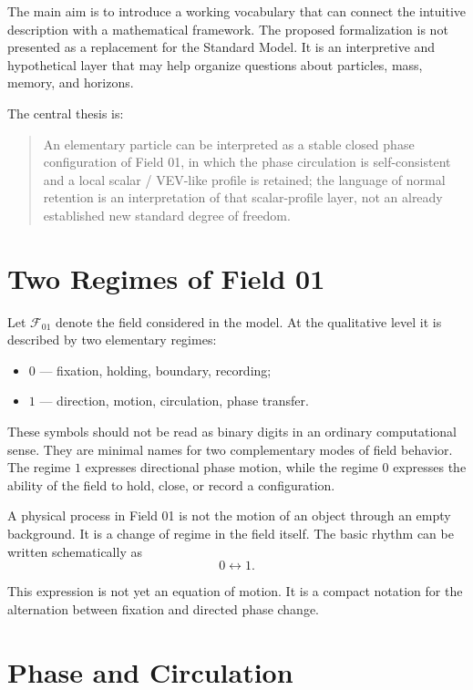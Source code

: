 \documentclass[11pt,a4paper]{article}
\newcommand{\field}{\mathcal{F}_{01}}
\begin{document}
The main aim is to introduce a working vocabulary that can connect the intuitive description with a mathematical framework. The proposed formalization is not presented as a replacement for the Standard Model. It is an interpretive and hypothetical layer that may help organize questions about particles, mass, memory, and horizons.

The central thesis is:
\begin{quote}
An elementary particle can be interpreted as a stable closed phase configuration of Field 01, in which the phase circulation is self-consistent and a local scalar / VEV-like profile is retained; the language of normal retention is an interpretation of that scalar-profile layer, not an already established new standard degree of freedom.
\end{quote}

\section{Two Regimes of Field 01}

Let $\field$ denote the field considered in the model. At the qualitative level it is described by two elementary regimes:
\begin{itemize}
\item $0$ --- fixation, holding, boundary, recording;
\item $1$ --- direction, motion, circulation, phase transfer.
\end{itemize}

These symbols should not be read as binary digits in an ordinary computational sense. They are minimal names for two complementary modes of field behavior. The regime $1$ expresses directional phase motion, while the regime $0$ expresses the ability of the field to hold, close, or record a configuration.

A physical process in Field 01 is not the motion of an object through an empty background. It is a change of regime in the field itself. The basic rhythm can be written schematically as
\begin{equation}
0 \leftrightarrow 1.
\end{equation}

This expression is not yet an equation of motion. It is a compact notation for the alternation between fixation and directed phase change.

\section{Phase and Circulation}
\end{document}
